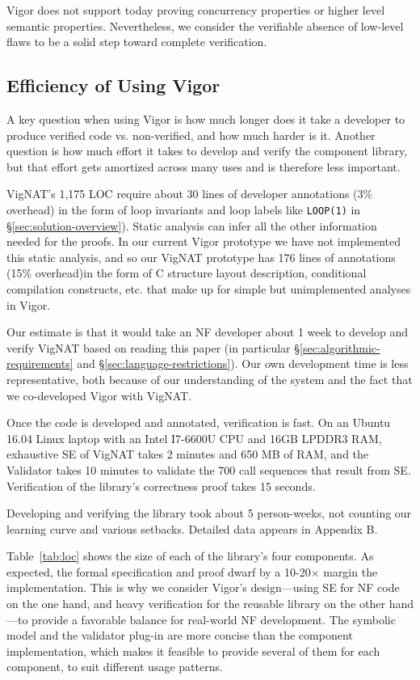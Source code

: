 \documentclass[letterpaper,twocolumn,10pt]{article}
\newcommand{\code}[1]{\texttt{#1}}
\newcommand{\vignat}{{\sc VigNAT}\xspace}
\begin{document}
Vigor does not support today proving concurrency properties or higher level semantic properties. Nevertheless, we consider the verifiable absence of low-level flaws to be a solid step toward complete verification.

\subsection{Efficiency of Using Vigor}
\label{sec:efficiency}

A key question when using Vigor is how much longer does it take a developer to produce verified code vs. non-verified, and how much harder is it.  Another question is how much effort it takes to develop and verify the component library, but that effort gets amortized across many uses and is therefore less important.

\vignat's 1,175 LOC require about 30 lines of developer annotations (3\% overhead) in the form of loop invariants and loop labels like \code{LOOP(1)} in \S\ref{sec:solution-overview}). Static analysis can infer all the other information needed for the proofs. In our current Vigor prototype we have not implemented this static analysis, and so our \vignat prototype has 176 lines of annotations (15\% overhead)in the form of C structure layout description, conditional compilation constructs, etc. that make up for simple but unimplemented analyses in Vigor.

Our estimate is that it would take an NF developer about 1 week to develop and verify \vignat based on reading this paper (in particular \S\ref{sec:algorithmic-requirements} and \S\ref{sec:language-restrictions}). Our own development time is less representative, both because of our understanding of the system and the fact that we co-developed Vigor with \vignat.

Once the code is developed and annotated, verification is fast. On an Ubuntu 16.04 Linux laptop with an Intel I7-6600U CPU and 16GB LPDDR3 RAM, exhaustive SE of \vignat takes 2 minutes and 650 MB of RAM, and the Validator takes 10 minutes to validate the 700 call sequences that result from SE. Verification of the library's correctness proof takes 15 seconds.

\medskip 

Developing and verifying the library took about 5 person-weeks, not counting our learning curve and various setbacks. Detailed data appears in Appendix B.

Table~\ref{tab:loc} shows the size of each of the library's four components.  As expected, the formal specification and proof dwarf by a 10-20$\times$ margin the implementation.  This is why we consider Vigor's design---using SE for NF code on the one hand, and heavy verification for the reusable library on the other hand---to provide a favorable balance for real-world NF development.  The symbolic model and the validator plug-in are more concise than the component implementation, which makes it feasible to provide several of them for each component, to suit different usage patterns.
\end{document}
